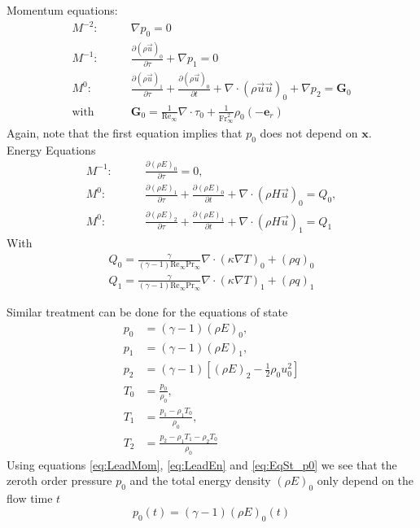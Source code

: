 	Momentum equations:
	\begin{align}
	M^{-2}:& \qquad \nabla p_0 = 0 \label{eq:LeadMom}\\
	M^{-1}:& \qquad \frac{\partial (\rho \vec{u})_0}{\partial \tau} + \nabla p_1 = 0\\
	M^{0}:&  \qquad \frac{\partial (\rho \vec{u})_1}{\partial \tau} + \frac{\partial (\rho \vec{u})_0}{\partial t} + \nabla \cdot (\rho \vec{u}\vec{u})_0 + \nabla p_2 = \mathbf{G}_0 \label{eq:secOrderMomEq}\\
	\text{with}& \qquad \mathbf{G}_0 = \frac{1}{\text{Re}_\infty}\nabla \cdot \tau_0 + \frac{1}{\text{Fr}_\infty^2}\rho_0(-\mathbf{e}_r)  
	\end{align}
	Again, note that the first equation implies that $p_0$ does not depend on $\mathbf{x}$.\\
	
	Energy Equations 
	\begin{align}
	M^{-1}:&\qquad \frac{\partial (\rho E)_0}{\partial \tau} = 0,\label{eq:LeadEn}\\
	M^{0}: &\qquad \frac{\partial (\rho E)_1}{\partial \tau} + \frac{\partial (\rho E)_0}{\partial t} + \nabla \cdot (\rho H \vec{u})_0= Q_0,\\
	M^{0}: &\qquad \frac{\partial (\rho E)_2}{\partial \tau} + \frac{\partial (\rho E)_1}{\partial t} + \nabla \cdot (\rho H \vec{u})_1= Q_1
	\end{align}
	With 
	\begin{gather}
	Q_0 = \frac{\gamma}{(\gamma - 1)\text{Re}_\infty \text{Pr}_\infty} \nabla \cdot (\kappa \nabla T)_0 + (\rho q)_0\\
	Q_1 = \frac{\gamma}{(\gamma - 1)\text{Re}_\infty \text{Pr}_\infty} \nabla \cdot (\kappa \nabla T)_1 + (\rho q)_1
	\end{gather}
	
	Similar treatment can be done for the equations of state
	\begin{align}
	p_0 &= (\gamma -1)(\rho E)_0,\label{eq:EqSt_p0}\\
	p_1 &= (\gamma -1)(\rho E)_1,\\
	p_2 &= (\gamma -1)[(\rho E)_2 - \frac{1}{2}\rho_0 u_0^2]\\
	T_0 &= \frac{p_0}{\rho_0},\\
	T_1 &= \frac{p_1-\rho_1 T_0}{\rho_0},\\
	T_2 &= \frac{p_2 - \rho_1 T_1 - \rho_2 T_0}{\rho_0}
	\end{align}
	Using equations \eqref{eq:LeadMom}, \eqref{eq:LeadEn} and \eqref{eq:EqSt_p0} we see that the zeroth order pressure $p_0$ and the total energy density $(\rho E )_0$ only depend on the flow time $t$
	\begin{equation}
	p_0(t) = (\gamma - 1) (\rho E)_0 (t)
	\end{equation}
	
